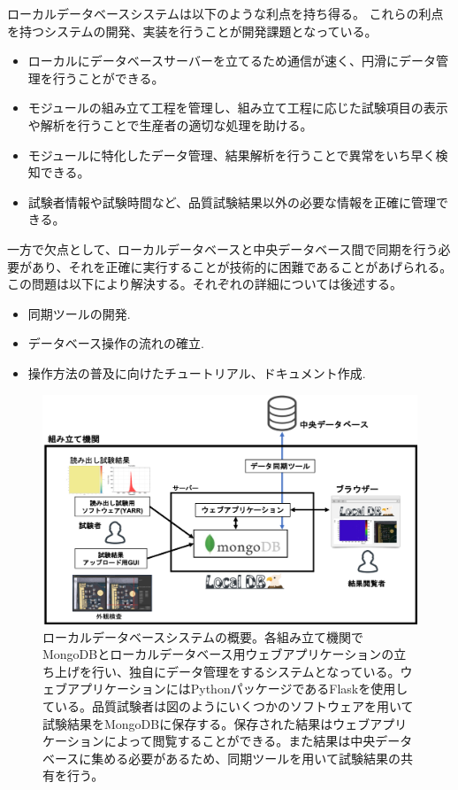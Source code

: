ローカルデータベースシステムは以下のような利点を持ち得る。
これらの利点を持つシステムの開発、実装を行うことが開発課題となっている。

\begin{itemize}
  \item ローカルにデータベースサーバーを立てるため通信が速く、円滑にデータ管理を行うことができる。
  \item モジュールの組み立て工程を管理し、組み立て工程に応じた試験項目の表示や解析を行うことで生産者の適切な処理を助ける。
  \item モジュールに特化したデータ管理、結果解析を行うことで異常をいち早く検知できる。
  \item 試験者情報や試験時間など、品質試験結果以外の必要な情報を正確に管理できる。
\end{itemize}

一方で欠点として、ローカルデータベースと中央データベース間で同期を行う必要があり、それを正確に実行することが技術的に困難であることがあげられる。
この問題は以下により解決する。それぞれの詳細については後述する。
\begin{itemize}
  \item 同期ツールの開発.
  \item データベース操作の流れの確立.
  \item 操作方法の普及に向けたチュートリアル、ドキュメント作成.
\end{itemize}

\begin{figure}[bpt]\centering
\includegraphics[width=12cm]{./localdb_overview.png}
\caption[ローカルデータベースシステムの概要]{ローカルデータベースシステムの概要。各組み立て機関でMongoDBとローカルデータベース用ウェブアプリケーションの立ち上げを行い、独自にデータ管理をするシステムとなっている。ウェブアプリケーションにはPythonパッケージであるFlaskを使用している。品質試験者は図のようにいくつかのソフトウェアを用いて試験結果をMongoDBに保存する。保存された結果はウェブアプリケーションによって閲覧することができる。また結果は中央データベースに集める必要があるため、同期ツールを用いて試験結果の共有を行う。}
\label{localdb_overview}
\end{figure}

